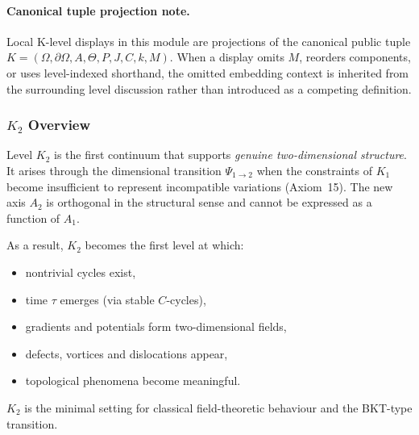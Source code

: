 



\paragraph{Canonical tuple projection note.}
Local K-level displays in this module are projections of the canonical public tuple \(K=(\Omega,\partial\Omega,A,\Theta,P,J,C,k,M)\). When a display omits \(M\), reorders components, or uses level-indexed shorthand, the omitted embedding context is inherited from the surrounding level discussion rather than introduced as a competing definition.

\subsubsection{\texorpdfstring{$K_2$}{K_2} Overview}
\label{sec:k2-overview}

Level $K_2$ is the first continuum that supports \emph{genuine
two-dimensional structure}. It arises through the dimensional transition
$\Psi_{1\to2}$ when the constraints of $K_1$ become insufficient to
represent incompatible variations (Axiom~15). The new axis $A_2$ is
orthogonal in the structural sense and cannot be expressed as a function
of $A_1$.

As a result, $K_2$ becomes the first level at which:
\begin{itemize}
    \item nontrivial cycles exist,
    \item time $\tau$ emerges (via stable $C$-cycles),
    \item gradients and potentials form two-dimensional fields,
    \item defects, vortices and dislocations appear,
    \item topological phenomena become meaningful.
\end{itemize}

$K_2$ is the minimal setting for classical field-theoretic behaviour and
the BKT-type transition.

